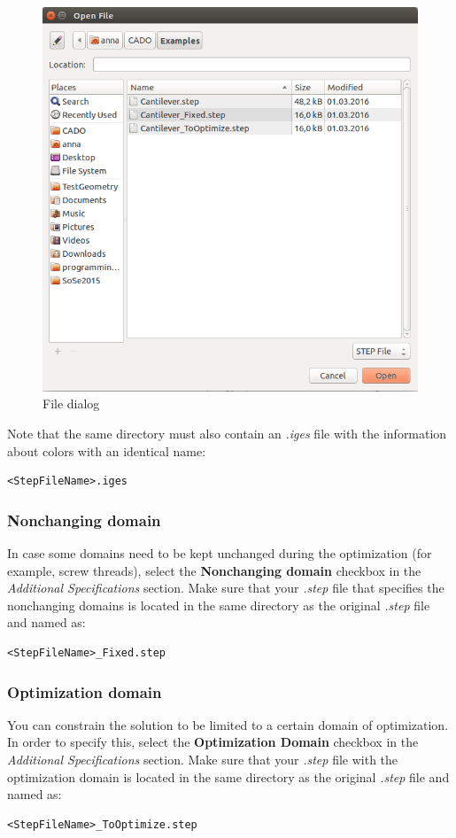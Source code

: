 \documentclass[
12pt, %
a4paper, %
oneside, %
headinclude,footinclude, %
BCOR5mm, %
]{scrartcl}
\begin{document}
\begin{figure}
\centering
\includegraphics[scale=0.4]{Pictures/chooseFileDialog.png}
\caption{File dialog}
\label{fig:fileDialog}
\end{figure} 

Note that the same directory must also contain an \textit{.iges} file with the information about colors with an identical name:
\begin{lstlisting}[language = {Promela}]
<StepFileName>.iges
\end{lstlisting}

\subsubsection{Nonchanging domain}
In case some domains need to be kept unchanged during the optimization (for example, screw threads), select the \textbf{Nonchanging domain} checkbox in the \textit{Additional Specifications} section. Make sure that your \textit{.step} file that specifies the nonchanging domains is located in the same directory as the original \textit{.step} file and named as:
\begin{lstlisting}[language = {Promela}]
<StepFileName>_Fixed.step
\end{lstlisting}

\subsubsection{Optimization domain}
You can constrain the solution to be limited to a certain domain of optimization. In order to specify this, select the \textbf{Optimization Domain} checkbox in the \textit{Additional Specifications} section. Make sure that your \textit{.step} file with the optimization domain is located in the same directory as the original \textit{.step} file and named as:
\begin{lstlisting}[language = {Promela}]
<StepFileName>_ToOptimize.step
\end{lstlisting}
\end{document}
